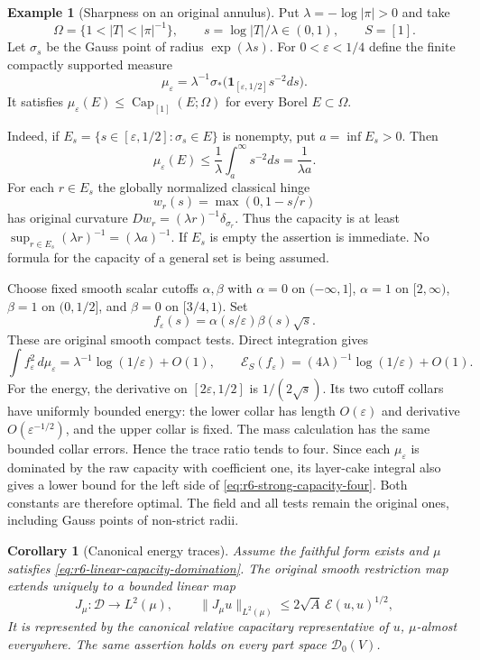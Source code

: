 \documentclass[11pt,a4paper]{article}
\numberwithin{equation}{section}
\newtheorem{corollary}[theorem]{Corollary}
\theoremstyle{definition}
\newtheorem{example}[theorem]{Example}
\theoremstyle{remark}
\begin{document}
\begin{example}[Sharpness on an original annulus]
\label{ex:r6-four-is-sharp}
Put $\lambda=-\log|\pi|>0$ and take
\[
       \Omega=\{1<|T|<|\pi|^{-1}\},\qquad
       s=\log|T|/\lambda\in(0,1),\qquad S=[1].
\]
Let $\sigma_s$ be the Gauss point of radius $\exp(\lambda s)$.
For $0<\varepsilon<1/4$ define the finite compactly supported measure
\[
 \mu_\varepsilon
    =\lambda^{-1}\sigma_*
                \bigl(\mathbf1_{[\varepsilon,1/2]}s^{-2}ds\bigr).
\]
It satisfies $\mu_\varepsilon(E)\le\operatorname{Cap}_{[1]}(E;\Omega)$
for every Borel $E\subset\Omega$.

Indeed, if $E_s=\{s\in[\varepsilon,1/2]:\sigma_s\in E\}$ is nonempty,
put $a=\inf E_s>0$. Then
\[
        \mu_\varepsilon(E)\le\frac1\lambda\int_a^\infty s^{-2}ds
                                      =\frac1{\lambda a}.
\]
For each $r\in E_s$ the globally normalized classical hinge
\[
                     w_r(s)=\max(0,1-s/r)
\]
has original curvature $D w_r=(\lambda r)^{-1}\delta_{\sigma_r}$.
Thus the capacity is at least
$\sup_{r\in E_s}(\lambda r)^{-1}=(\lambda a)^{-1}$.
If $E_s$ is empty the assertion is immediate. No formula for the
capacity of a general set is being assumed.

Choose fixed smooth scalar cutoffs $\alpha,\beta$ with
$\alpha=0$ on $(-\infty,1]$, $\alpha=1$ on $[2,\infty)$,
$\beta=1$ on $(0,1/2]$, and $\beta=0$ on $[3/4,1)$.
Set
\[
                f_\varepsilon(s)
                       =\alpha(s/\varepsilon)\beta(s)\sqrt{s}.
\]
These are original smooth compact tests. Direct integration gives
\[
 \int f_\varepsilon^2\,d\mu_\varepsilon
                   =\lambda^{-1}\log(1/\varepsilon)+O(1),
 \qquad
 \mathcal E_S(f_\varepsilon)
                   =(4\lambda)^{-1}\log(1/\varepsilon)+O(1).
\]
For the energy, the derivative on $[2\varepsilon,1/2]$ is
$1/(2\sqrt{s})$. Its two cutoff collars have uniformly bounded
energy: the lower collar has length $O(\varepsilon)$ and derivative
$O(\varepsilon^{-1/2})$, and the upper collar is fixed. The mass
calculation has the same bounded collar errors. Hence the trace ratio
tends to four. Since each $\mu_\varepsilon$ is dominated by the raw
capacity with coefficient one, its layer-cake integral also gives a
lower bound for the left side of \eqref{eq:r6-strong-capacity-four}.
Both constants are therefore optimal. The field and all tests remain
the original ones, including Gauss points of non-strict radii.
\end{example}

\begin{corollary}[Canonical energy traces]
\label{cor:r6-capacity-energy-trace-map}
Assume the faithful form exists and $\mu$ satisfies
\eqref{eq:r6-linear-capacity-domination}. The original smooth restriction
map extends uniquely to a bounded linear map
\[
             J_\mu:\mathscr D\longrightarrow L^2(\mu),
           \qquad \|J_\mu u\|_{L^2(\mu)}
                          \le2\sqrt A\,\mathcal E(u,u)^{1/2},
\]
It is represented by the canonical relative
capacitary representative of $u$, $\mu$-almost everywhere. The same
assertion holds on every part space $\mathscr D_0(V)$.
\end{corollary}
\end{document}
